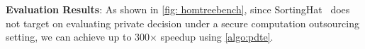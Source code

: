 {\bf{Evaluation Results}}: As shown in \cref{fig: homtreebench}, 
since SortingHat~\cite{sortinghat} does not target
on evaluating private decision under a secure computation outsourcing setting, we can achieve
up to 300$\times$ speedup using \cref{algo:pdte}.




